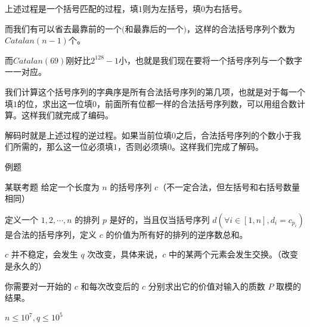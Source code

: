 \documentclass[UTF8]{beamer}
\begin{document}
\begin{frame}
    上述过程是一个括号匹配的过程，填$1$则为左括号，填$0$为右括号。

    而我们有可以省去最靠前的一个$($和最靠后的一个$)$，这样的合法括号序列个数为$Catalan(n-1)$个。

    而$Catalan(69)$刚好比$2^{128}-1$小，也就是我们现在要将一个括号序列与一个数字一一对应。

    \pause

    我们计算这个括号序列的字典序是所有合法括号序列的第几项，也就是对于每一个填$1$的位，求出这一位填$0$，前面所有位都一样的合法括号序列数，可以用组合数计算。这样我们就完成了编码。

    解码时就是上述过程的逆过程。如果当前位填$0$之后，合法括号序列的个数小于我们所需的，那么这一位必须填$1$，否则必须填$0$。这样我们完成了解码。
\end{frame}

\begin{frame}{例题}
    \begin{block}{某联考题}
        给定一个长度为 $n$ 的括号序列 $c$（不一定合法，但左括号和右括号数量相同）

    定义一个 $1,2,\cdots,n$ 的排列 $p$ 是好的，当且仅当括号序列 $d(\forall i\in [1,n],d_i=c_{p_i})$ 是合法的括号序列，定义 $c$ 的价值为所有好的排列的逆序数总和。

    $c$ 并不稳定，会发生 $q$ 次改变，具体来说，$c$ 中的某两个元素会发生交换。（改变是永久的）

    你需要对一开始的 $c$ 和每次改变后的 $c$ 分别求出它的价值对输入的质数 $P$ 取模的结果。

    $n\le 10^7,q\le 10^5$
    \end{block}


\end{frame}
\end{document}
